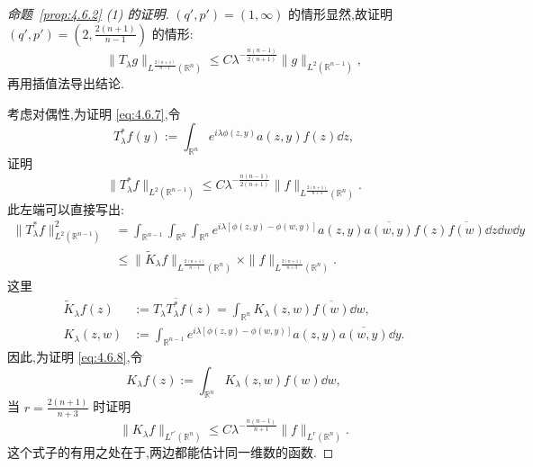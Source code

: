 \begin{proof}[命题~\ref{prop:4.6.2} (1) 的证明]
$(q', p') = (1, \infty)$ 的情形显然,故证明 $(q', p') = \left(2, \frac{2(n+1)}{n-1}\right)$ 的情形:
\begin{equation}
\|T_{\lambda}g\|_{L^{\frac{2(n+1)}{n-1}}(\mathbb{R}^{n})} \leq C\lambda^{-\frac{n(n-1)}{2(n+1)}}\|g\|_{L^{2}(\mathbb{R}^{n-1})},\tag{4.6.7}
\label{eq:4.6.7}\end{equation}
再用插值法导出结论.

考虑对偶性,为证明 \eqref{eq:4.6.7},令
\begin{equation*}
T_{\lambda}^{*}f(y) := \int_{\mathbb{R}^{n}}e^{i\lambda\phi(z, y)}a(z, y)f(z)\dd z,
\end{equation*}
证明
\begin{equation}
\|T_{\lambda}^{*}f\|_{L^{2}(\mathbb{R}^{n-1})} \leq C\lambda^{-\frac{n(n-1)}{2(n+1)}}\|f\|_{L^{\frac{2(n+1)}{n+3}}(\mathbb{R}^{n})}.\tag{4.6.8}
\label{eq:4.6.8}\end{equation}
此左端可以直接写出:
\begin{equation}
\begin{aligned}
\|T_{\lambda}^{*}f\|_{L^{2}(\mathbb{R}^{n-1})}^{2} & = \int_{\mathbb{R}^{n-1}}\int_{\mathbb{R}^{n}}\int_{\mathbb{R}^{n}}e^{i\lambda[\phi(z, y) - \phi(w, y)]}a(z, y)\overline{a(w, y)}f(z)\overline{f(w)}\dd z\dd w\dd y \\
& \leq \|\tilde{K}_{\lambda}f\|_{L^{\frac{2(n+1)}{n-1}}(\mathbb{R}^{n})}\times\|f\|_{L^{\frac{2(n+1)}{n+3}}(\mathbb{R}^{n})}.
\end{aligned}
\end{equation}
这里
\begin{equation}
\begin{aligned}
\tilde{K}_{\lambda}f(z) & := T_{\lambda}\overline{T_{\lambda}^{*}f}(z) = \int_{\mathbb{R}^{n}}K_{\lambda}(z, w)\overline{f(w)}\dd w, \\
K_{\lambda}(z, w) & := \int_{\mathbb{R}^{n-1}}e^{i\lambda[\phi(z, y) - \phi(w, y)]}a(z, y)\overline{a(w, y)}\dd y.
\end{aligned}
\end{equation}
因此,为证明 \eqref{eq:4.6.8},令
\begin{equation*}
K_{\lambda}f(z) := \int_{\mathbb{R}^{n}}K_{\lambda}(z, w)f(w)\dd w,
\end{equation*}
当 $r = \frac{2(n+1)}{n+3}$ 时证明
\begin{equation}
\|K_{\lambda}f\|_{L^{r'}(\mathbb{R}^{n})} \leq C\lambda^{-\frac{n(n-1)}{n+1}}\|f\|_{L^{r}(\mathbb{R}^{n})}.\tag{4.6.9}
\label{eq:4.6.9}\end{equation}
这个式子的有用之处在于,两边都能估计同一维数的函数.


\end{proof}

